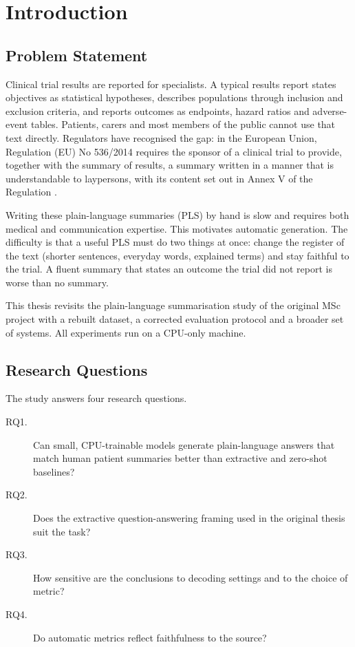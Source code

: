 
\chapter{Introduction} %
\label{Chapter1}

\section{Problem Statement}

Clinical trial results are reported for specialists. A typical results report states objectives as statistical hypotheses, describes populations through inclusion and exclusion criteria, and reports outcomes as endpoints, hazard ratios and adverse-event tables. Patients, carers and most members of the public cannot use that text directly. Regulators have recognised the gap: in the European Union, Regulation (EU) No 536/2014 requires the sponsor of a clinical trial to provide, together with the summary of results, a summary written in a manner that is understandable to laypersons, with its content set out in Annex V of the Regulation \parencite[Art.~37(4)]{eu2014ctr}.

Writing these plain-language summaries (PLS) by hand is slow and requires both medical and communication expertise. This motivates automatic generation. The difficulty is that a useful PLS must do two things at once: change the register of the text (shorter sentences, everyday words, explained terms) and stay faithful to the trial. A fluent summary that states an outcome the trial did not report is worse than no summary.

This thesis revisits the plain-language summarisation study of the original MSc project \parencite{barmpas2024pls} with a rebuilt dataset, a corrected evaluation protocol and a broader set of systems. All experiments run on a CPU-only machine.

\section{Research Questions}

The study answers four research questions.

\begin{description}
    \item[RQ1.] Can small, CPU-trainable models generate plain-language answers that match human patient summaries better than extractive and zero-shot baselines?
    \item[RQ2.] Does the extractive question-answering framing used in the original thesis suit the task?
    \item[RQ3.] How sensitive are the conclusions to decoding settings and to the choice of metric?
    \item[RQ4.] Do automatic metrics reflect faithfulness to the source?
\end{description}


